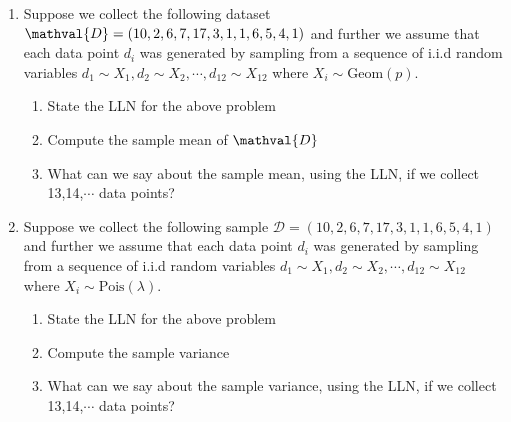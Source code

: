 \begin{enumerate}
    \item Suppose we collect the following dataset $\mathval{D} = (10,2,6,7,17,3,1,1,6,5,4,1)$ and further we assume that each data point $d_{i}$ was generated by sampling from a sequence of i.i.d random variables  $d_{1} \sim X_{1}, d_{2} \sim X_{2}, \cdots, d_{12} \sim X_{12}$ where $X_{i} \sim \text{Geom}(p)$.  
    \begin{enumerate}
        \item State the LLN for the above problem
        \item Compute the sample mean of $\mathval{D}$
        \item What can we say about the sample mean, using the LLN, if we collect 13,14,$\cdots$ data points?  
    \end{enumerate}
    
    \item  Suppose we collect the following sample $\mathcal{D} = (10,2,6,7,17,3,1,1,6,5,4,1)$ and further we assume that each data point $d_{i}$ was generated by sampling from a sequence of i.i.d random variables  $d_{1} \sim X_{1}, d_{2} \sim X_{2}, \cdots, d_{12} \sim X_{12}$ where $X_{i} \sim \text{Pois}(\lambda)$.
    \begin{enumerate}
        \item State the LLN for the above problem
        \item Compute the sample variance
        \item What can we say about the sample variance, using the LLN, if we collect 13,14,$\cdots$ data points?
    \end{enumerate}
    

\end{enumerate}
